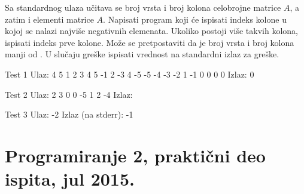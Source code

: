 \begin{Exercise}[label=903]
Sa standardnog ulaza učitava se broj vrsta i broj kolona celobrojne matrice $A$, a zatim i elementi matrice $A$. Napisati program koji će ispisati indeks kolone u kojoj se nalazi najviše negativnih elemenata. Ukoliko postoji više takvih kolona, ispisati indeks prve kolone. Može se pretpostaviti da je broj vrsta i broj kolona manji od . U slučaju greške ispisati vrednost  na standardni izlaz za greške. 

\begin{minitest}
\begin{test}{Test 1}
Ulaz:                         
  4                             
  5                                                               
  1  2  3  4  5               
 -1  2 -3  4 -5                
 -5 -4 -3 -2  1               
 -1  0  0  0  0 
 Izlaz:                         
  0                                                    
\end{test}
\end{minitest}
\begin{minitest}
\begin{test}{Test 2}
Ulaz:                         
 2                               
 3                                 
 0 0 -5
 1 2 -4
Izlaz:   
\end{test}
\end{minitest}
\begin{minitest}
\begin{test}{Test 3}
Ulaz:                         
 -2
Izlaz (na stderr):
 -1
\end{test}
\end{minitest}


\end{Exercise}
\begin{Answer}[ref=903]
\end{Answer}

\section{Programiranje 2, praktični deo ispita, jul 2015.}


